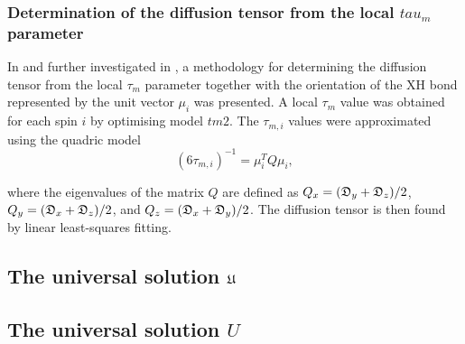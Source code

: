 \begin{htmlonly}
\begin{htmlonly}
\begin{htmlonly}
    \subsubsection{Determination of the diffusion tensor from the local $tau_m$ parameter}
\end{htmlonly}

In \citet{Bruschweiler95} and further investigated in \citet{Lee97}, a methodology for determining the diffusion tensor from the local $\tau_m$ parameter together with the orientation of the XH bond represented by the unit vector $\mu_i$ was presented.  A local $\tau_m$ value was obtained for each spin $i$ by optimising model $tm2$.  The $\tau_{m,i}$ values were approximated using the quadric model
\begin{equation} \label{eq: quadric}
 (6 \tau_{m,i})^{-1} = \mu_i^T Q \mu_i,
\end{equation}

\noindent where the eigenvalues of the matrix $Q$ are defined as $Q_x = (\mathfrak{D}_y + \mathfrak{D}_z)/2$, $Q_y = (\mathfrak{D}_x + \mathfrak{D}_z)/2$, and $Q_z = (\mathfrak{D}_x + \mathfrak{D}_y)/2$.  The diffusion tensor is then found by linear least-squares fitting.




\begin{latexonly}
    \subsection{The universal solution $\mathfrak{U}$}
\end{latexonly}
\begin{htmlonly}
    \subsection{The universal solution $U$}
\end{htmlonly}
\label{sect: universal solution}


\end{htmlonly}
\end{htmlonly}
